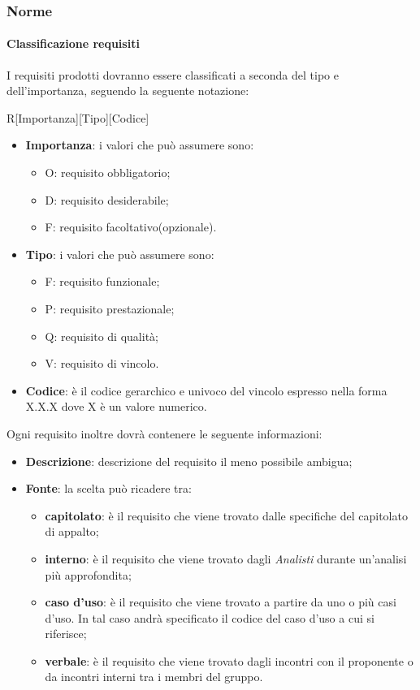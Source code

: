 		\subsubsection{Norme}
			\paragraph{Classificazione requisiti}
I requisiti prodotti dovranno essere classificati a seconda del tipo e dell'importanza, seguendo la seguente notazione:
				\begin{center}
					R[Importanza][Tipo][Codice]
				\end{center}
			\noindent
				\begin{itemize}
					\item \textbf{Importanza}: i valori che può assumere sono:
						\begin{itemize}
							\item O: requisito obbligatorio;
							\item D: requisito desiderabile;
							\item F: requisito facoltativo(opzionale).
						\end{itemize}
					\item \textbf{Tipo}: i valori che può assumere sono:
						\begin{itemize}
							\item F: requisito funzionale;
							\item P: requisito prestazionale;
							\item Q: requisito di qualità;
							\item V: requisito di vincolo.
						\end{itemize}
					\item \textbf{Codice}: è il codice gerarchico e univoco del vincolo espresso nella forma X.X.X dove X è un valore numerico.
				\end{itemize}
			\noindent
			Ogni requisito inoltre dovrà contenere le seguente informazioni:
				\begin{itemize}
					\item \textbf{Descrizione}: descrizione del requisito il meno possibile ambigua;
					\item \textbf{Fonte}: la scelta può ricadere tra:
						\begin{itemize}
							\item \textbf{capitolato}: è il requisito che viene trovato dalle specifiche del capitolato di appalto;
							\item \textbf{interno}: è il requisito che viene trovato dagli \emph{Analisti} durante un'analisi più approfondita;
							\item \textbf{caso d'uso}: è il requisito che viene trovato a partire da uno o più casi d'uso. In tal caso andrà specificato il codice del caso d'uso a cui si riferisce;
							\item \textbf{verbale}: è il requisito che viene trovato dagli incontri con il proponente o da incontri interni tra i membri del gruppo.
						\end{itemize}
				\end{itemize}

